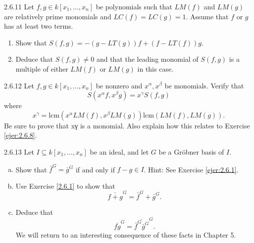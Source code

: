 \documentclass[twoside]{article}
\begin{document}
\newpage

\begin{ejercicio}{2.6.11}
Let $f , g ∈ k[x_1,\dots , x_n]$ be polynomials such that $LM( f )$ and $LM(g)$ are relatively prime
monomials and $LC( f) = LC(g) = 1$. Assume that $f$ or $g$ has at least two terms.
\begin{enumerate}
\item Show that $S( f , g) = −(g − LT(g))f + (f − LT( f ))g$.
\item Deduce that $S( f , g) \neq 0$ and that the leading monomial of $S( f , g)$ is a multiple of
either $LM( f )$ or $LM(g)$ in this case.
\end{enumerate}
\end{ejercicio}
\begin{solucion}

\end{solucion}

\newpage

\begin{ejercicio}{2.6.12}
Let $f , g ∈ k[x_1,\dots , x_n]$ be nonzero and $x^α, x^β$ be monomials. Verify that
$$S(x^αf , x^βg) = x^γS( f , g)$$
where
$$x^γ =
\mathrm{lcm}(x^αLM( f ), x^βLM(g))
\mathrm{lcm}(LM( f ), LM(g))
.$$
Be sure to prove that xγ is a monomial. Also explain how this relates to Exercise \ref{ejer:2.6.8}.
\end{ejercicio}
\begin{solucion}

\end{solucion}

\newpage

\begin{ejercicio}{2.6.13}
Let $I ⊆ k[x_1,\dots , x_n]$ be an ideal, and let $G$ be a Gröbner basis of $I$.
\begin{enumerate}[a.]
\item Show that $\bar{f}^G = \bar{g}^G$ if and only if $f − g ∈ I$. Hint: See Exercise \ref{ejer:2.6.1}.
\item Use Exercise \ref{2.6.1} to show that
$$\bar{f + g}^G = \bar{f}^G + \bar{g}^G.$$
\item Deduce that
$$\overline{fg}^G = \overline{\bar{f}^G  \bar{g}^G}^G
.$$
We will return to an interesting consequence of these facts in Chapter 5.
\end{enumerate}
\end{ejercicio}
\begin{solucion}
\end{solucion}
\end{document}
